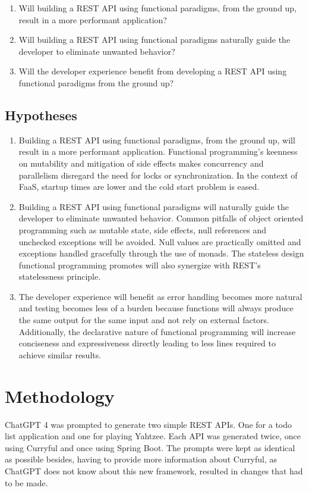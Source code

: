 \documentclass[a4paper]{article}
\begin{document}
\begin{enumerate}
	\item Will building a REST API using functional paradigms, from the
	      ground up, result in a more performant application?
	\item Will building a REST API using functional paradigms naturally
	      guide the developer to eliminate unwanted behavior?
	\item Will the developer experience benefit from developing a REST API using
	      functional paradigms from the ground up?
\end{enumerate}

\subsection{Hypotheses}

\begin{enumerate}
	\item Building a REST API using functional paradigms, from the ground
	      up, will result in a more performant application. Functional
	      programming's keenness on mutability and mitigation of side effects
	      makes concurrency and parallelism disregard the need for locks or
	      synchronization. In the context of FaaS, startup times are lower
	      and the cold start problem is eased.
	\item Building a REST API using functional paradigms will naturally guide
	      the developer to eliminate unwanted behavior. Common pitfalls of
	      object oriented programming such as mutable state, side effects,
	      null references and unchecked exceptions will be avoided. Null
	      values are practically omitted and exceptions handled gracefully
	      through the use of monads. The stateless design functional
	      programming promotes will also synergize with REST's statelessness
	      principle.
	\item The developer experience will benefit as error handling becomes more
	      natural and testing becomes less of a burden because functions will
	      always produce the same output for the same input and not rely on
	      external factors. Additionally, the declarative nature of functional
	      programming will increase conciseness and expressiveness directly
	      leading to less lines required to achieve similar results.
\end{enumerate}

\section{Methodology}
ChatGPT 4 was prompted to generate two simple REST APIs. One for a todo list
application and one for playing Yahtzee. Each API was generated twice, once
using Curryful and once using Spring Boot. The prompts were kept as identical as
possible besides, having to provide more information about Curryful, as ChatGPT
does not know about this new framework, resulted in changes that had to be made.
\end{document}
